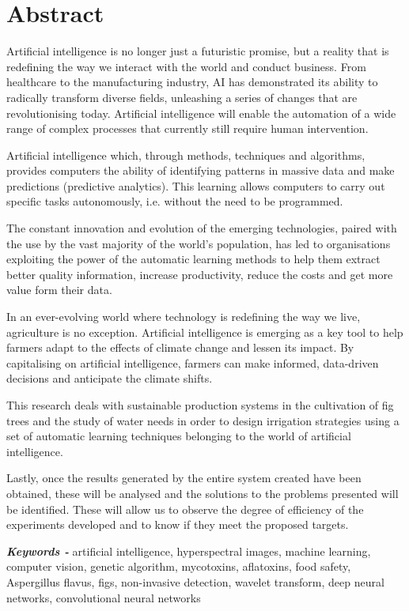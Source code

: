 \renewcommand{\keywords}{{\itshape \bfseries Keywords - }}
\chapter*{Abstract} 

Artificial intelligence is no longer just a futuristic promise, but a reality that is redefining the way we interact with the world and conduct business. From healthcare to the manufacturing industry, AI has demonstrated its ability to radically transform diverse fields, unleashing a series of changes that are revolutionising today. Artificial intelligence will enable the automation of a wide range of complex processes that currently still require human intervention.  

\vspace{5mm}

Artificial intelligence which, through methods, techniques and algorithms, provides computers the ability of identifying patterns in massive data and make predictions (predictive analytics). This learning allows computers to carry out specific tasks autonomously, i.e. without the need to be programmed.

\vspace{5mm}

The constant innovation and evolution of the emerging technologies, paired with the use by the vast majority of the world’s population, has led to organisations exploiting the power of the automatic learning methods to help them extract better quality information, increase productivity, reduce the costs and get more value form their data.

\vspace{5mm}

In an ever-evolving world where technology is redefining the way we live, agriculture is no exception. Artificial intelligence is emerging as a key tool to help farmers adapt to the effects of climate change and lessen its impact. By capitalising on artificial intelligence, farmers can make informed, data-driven decisions and anticipate the climate shifts.

\vspace{5mm}

This research deals with sustainable production systems in the cultivation of fig trees and the study of water needs in order to design irrigation strategies using a set of automatic learning techniques belonging to the world of artificial intelligence.

\vspace{5mm}

Lastly, once the results generated by the entire system created have been obtained, these will be analysed and the solutions to the problems presented will be identified. These will allow us to observe the degree of efficiency of the experiments developed and to know if they meet the proposed targets.

\vspace{5mm}

\keywords{artificial intelligence, hyperspectral images, machine learning, computer vision, genetic algorithm, mycotoxins, aflatoxins, food safety, Aspergillus flavus, figs, non-invasive detection, wavelet transform, deep neural networks, convolutional neural networks}